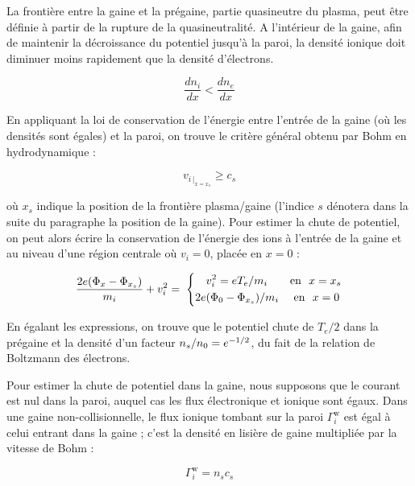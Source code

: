 \begin{refsection}
La frontière entre la gaine et la prégaine, partie quasineutre du plasma, peut
être définie à partir de la rupture de la quasineutralité. A l'intérieur de la
gaine, afin de maintenir la décroissance du potentiel jusqu'à la paroi, la
densité ionique doit diminuer moins rapidement que la densité d'électrons.
 
\begin{equation}
	\frac{dn_{i}}{dx}<\frac{dn_{e}}{dx}
\end{equation}

En appliquant la
loi de conservation de l'énergie entre l'entrée de la gaine (où les densités
sont égales) et la paroi, on trouve le critère général obtenu par Bohm en
hydrodynamique :

\begin{equation}
	v_{{i}\,|_{x=x_s}}\geq c_{s}
\end{equation}

où $x_s$ indique la position de la frontière plasma/gaine (l'indice $s$ dénotera
dans la suite du paragraphe la position de la gaine).
Pour estimer la chute de potentiel, on peut alors écrire la conservation de
l'énergie des ions à l'entrée de la gaine et au niveau d'une région centrale
où $v_{i}=0$, placée en $x=0$ :

\begin{equation}
	\frac{2e(\Phi_{x}-\Phi_{x_{s}})}{m_{i}}+v_{i}^{{2}}=\;\left\{
	\begin{aligned}
	v_i^2=eT_{e}/m_{i}\text{~~~~~~en~~}{x=x_s}\\
	2e(\Phi_{0}-\Phi_{x_{s}})/m_{i}\text{~~~~en~~}{x=0\,}
	\end{aligned}\right.
\end{equation}

En égalant les expressions, on trouve que le potentiel chute de
$T_{e}/2$ dans la prégaine et la densité d'un facteur
$n_{s}/n{_{0}}=e^{-1/2}$, du fait de la relation de Boltzmann des électrons.

Pour estimer la chute de potentiel dans la gaine, nous supposons que le
courant est nul dans la paroi, auquel cas les flux électronique et ionique sont
égaux. Dans une gaine non-collisionnelle, le flux ionique
tombant sur la paroi $\Gamma_i^\text{w}$ est égal à celui entrant dans la gaine
; c'est la densité en lisière de gaine multipliée par la vitesse de Bohm :

\begin{equation}
\Gamma_i^\text{w}=n_sc_s
\end{equation}


\end{refsection}
